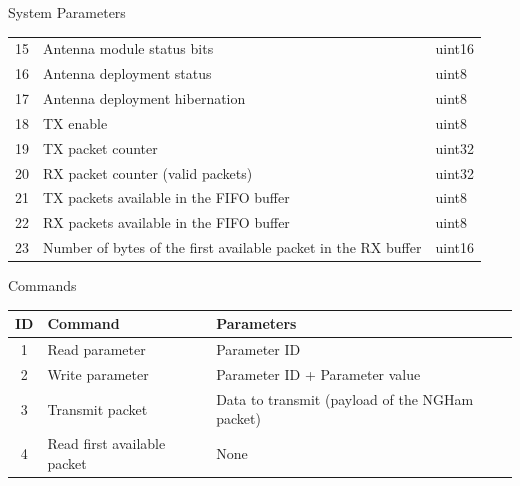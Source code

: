 \begin{frame}{System Parameters}
\begin{table}[!htb]
\begin{tabular}{cll}
        15  & Antenna module status bits                                        & uint16 \\
        16  & Antenna deployment status                                         & uint8 \\
        17  & Antenna deployment hibernation                                    & uint8 \\
        18  & TX enable                                                         & uint8 \\
        19  & TX packet counter                                                 & uint32 \\
        20  & RX packet counter (valid packets)                                 & uint32 \\
        21  & TX packets available in the FIFO buffer                           & uint8 \\
        22  & RX packets available in the FIFO buffer                           & uint8 \\
        23  & Number of bytes of the first available packet in the RX buffer    & uint16 \\
        \bottomrule[1.5pt]
    \end{tabular}
\end{table}

\end{frame}

\begin{frame}{Commands}

\begin{table}[!htb]\scriptsize
    \centering
    \label{tab:vars-and-pars}
    \begin{tabular}{cll}
        \toprule[1.5pt]
        \textbf{ID} & \textbf{Command} & \textbf{Parameters}\\
        \midrule
        1   & Read parameter              & Parameter ID \\
        2   & Write parameter             & Parameter ID + Parameter value \\
        3   & Transmit packet             & Data to transmit (payload of the NGHam packet) \\
        4   & Read first available packet & None \\
        \bottomrule[1.5pt]
    \end{tabular}
\end{table}

\end{frame}


